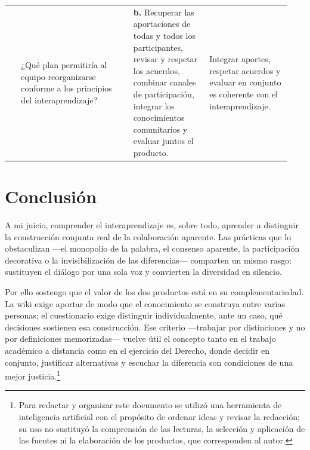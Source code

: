 \documentclass[
  spanish,
  letterpaper, oneside
]{article}
\begin{document}
\begin{landscape}
\begin{longtable}{@{}>{\centering\arraybackslash}p{0.045\linewidth}>{\raggedright\arraybackslash}p{0.37\linewidth}>{\raggedright\arraybackslash}p{0.25\linewidth}>{\raggedright\arraybackslash}p{0.27\linewidth}@{}}
\midrule
10 & ¿Qué plan permitiría al equipo reorganizarse conforme a los principios del interaprendizaje? & \textbf{b.} Recuperar las aportaciones de todas y todos los participantes, revisar y respetar los acuerdos, combinar canales de participación, integrar los conocimientos comunitarios y evaluar juntos el producto. & Integrar aportes, respetar acuerdos y evaluar en conjunto es coherente con el interaprendizaje. \\
\end{longtable}
\endgroup
\end{landscape}
\clearpage
\pagestyle{fancy}

\clearpage
\section{Conclusión}

A mi juicio, comprender el interaprendizaje es, sobre todo, aprender a distinguir la
construcción conjunta real de la colaboración aparente. Las prácticas que lo
obstaculizan —el monopolio de la palabra, el consenso aparente, la participación
decorativa o la invisibilización de las diferencias— comparten un mismo rasgo:
sustituyen el diálogo por una sola voz y convierten la diversidad en silencio.

Por ello sostengo que el valor de los dos productos está en su complementariedad. La
wiki exige aportar de modo que el conocimiento se construya entre varias personas; el
cuestionario exige distinguir individualmente, ante un caso, qué decisiones sostienen
esa construcción. Ese criterio —trabajar por distinciones y no por definiciones
memorizadas— vuelve útil el concepto tanto en el trabajo académico a distancia como
en el ejercicio del Derecho, donde decidir en conjunto, justificar alternativas y
escuchar la diferencia son condiciones de una mejor
justicia.\footnote{Para redactar y organizar este documento se utilizó una
herramienta de inteligencia artificial con el propósito de ordenar ideas y revisar la
redacción; su uso no sustituyó la comprensión de las lecturas, la selección y
aplicación de las fuentes ni la elaboración de los productos, que corresponden al
autor.}

\clearpage
\nocite{bertely2011interaprendizajes,diazAlonso2011construccion,pech2016manual,cushpa2022pacie,silva2015metodologias}

\end{document}
